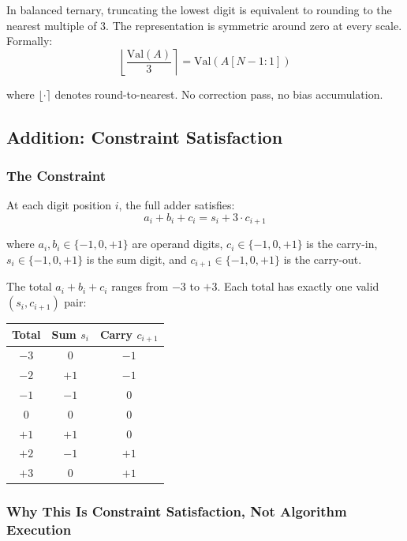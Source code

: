 \documentclass[11pt,a4paper]{article}
\begin{document}
In balanced ternary, truncating the lowest digit is equivalent to rounding to the nearest multiple of 3. The representation is symmetric around zero at every scale. Formally:
\begin{equation}
\left\lfloor \frac{\text{Val}(A)}{3} \right\rceil = \text{Val}(A[N-1:1])
\end{equation}

where $\lfloor \cdot \rceil$ denotes round-to-nearest. No correction pass, no bias accumulation.

\subsection{Addition: Constraint Satisfaction}

\subsubsection{The Constraint}

At each digit position $i$, the full adder satisfies:
\begin{equation}
a_i + b_i + c_i = s_i + 3 \cdot c_{i+1}
\label{eq:bt_constraint}
\end{equation}

where $a_i, b_i \in \{-1, 0, +1\}$ are operand digits, $c_i \in \{-1, 0, +1\}$ is the carry-in, $s_i \in \{-1, 0, +1\}$ is the sum digit, and $c_{i+1} \in \{-1, 0, +1\}$ is the carry-out.

The total $a_i + b_i + c_i$ ranges from $-3$ to $+3$. Each total has exactly one valid $(s_i, c_{i+1})$ pair:

\begin{center}
\begin{tabular}{ccc}
\toprule
\textbf{Total} & \textbf{Sum $s_i$} & \textbf{Carry $c_{i+1}$} \\
\midrule
$-3$ & $0$ & $-1$ \\
$-2$ & $+1$ & $-1$ \\
$-1$ & $-1$ & $0$ \\
$0$  & $0$ & $0$ \\
$+1$ & $+1$ & $0$ \\
$+2$ & $-1$ & $+1$ \\
$+3$ & $0$ & $+1$ \\
\bottomrule
\end{tabular}
\end{center}

\subsubsection{Why This Is Constraint Satisfaction, Not Algorithm Execution}
\end{document}
